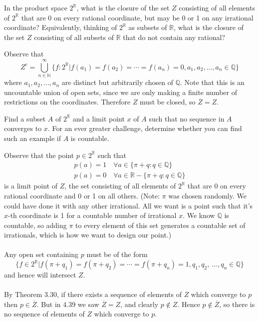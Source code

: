 \documentclass[a4paper,12pt,twoside]{hmcpset}
\begin{document}
\begin{exercise}[Exercise 4.39]
    In the product space $2^{\mathbb{R}}$, what is the closure of the set
$Z$ consisting of all elements of $2^\mathbb{R}$ that are 0 on
every rational coordinate, but may be 0 or 1 on any irrational
coordinate? Equivalently, thinking of $2^{\mathbb{R}}$ as subsets
of $\mathbb{R}$, what is the closure of the set $Z$ consisting of
all subsets of $\mathbb{R}$ that do not contain any rational? 
\end{exercise}

\begin{solution}
Observe that 
\[
    Z^c = \bigcup_{n \in \mathbb{N}}^{\infty} \{f : {2}^{\mathbb{R}} | f(a_1) = f(a_2) = \cdots = f(a_n) = 0, a_1, a_2, \dots, a_n \in \mathbb{Q}\}
\]
where $a_1, a_2, \dots, a_n$ are distinct but arbitrarily chosen of
$\mathbb{Q}$. Note that this is an uncountable union of open sets,
since we are only making a finite number of restrictions on the
coordinates. Therefore $Z$ must be closed, so $\overline{Z} = Z$.
\end{solution}

\begin{exercise}[Exercise 4.40]
    Find a subset $A$ of $2^\mathbb{R}$ and a limit
point $x$ of $A$ such that
no sequence in $A$ converges to $x$. For an ever greater challenge,
determine whether you can find such an example if $A$ is countable.
\end{exercise}

\begin{solution}
Observe that the point $p \in 2^{\mathbb{R}}$ such that 
\begin{gather*}
    p(a) = 1 \quad \forall a \in \{\pi + q : q \in \mathbb{Q}\}\\
    p(a) = 0 \quad \forall a \in \mathbb{R} - \{\pi + q : q \in \mathbb{Q}\}
\end{gather*} 
is a limit point of $Z$, the set consisting of
all elements of $2^\mathbb{R}$ that are 0 on every rational coordinate
and 0 or 1 on all others.
(Note: $\pi$ was chosen randomly. We could have done it with any other
irrational. All we want is a point such that it's $x$-th coordinate is
1 for a countable number of irrational $x$. We know $\mathbb{Q}$ is
countable, so adding $\pi$ to every element of this set generates a
countable set of irrationals, which is how we want to design our point.)
\\
\\
Any open set containing $p$ must be of the form 
\[
    \{
        f \in 2^\mathbb{R} | f(\pi + q_1) = f(\pi + q_2) = \cdots = f(\pi + q_n) = 1, q_1, q_2, \
        \dots, q_n \in \mathbb{Q}  
    \}
\]
and hence will intersect $Z$.
\\
\\
By Theorem 3.30, if there exists a sequence
of elements of $Z$ which converge to $p$ then $p \in \overline{Z}.$
But in 4.39 we saw $\overline{Z} = Z$, and clearly $p \not\in Z$.
Hence $p \not\in \overline{Z}$, so there is no sequence of elements of
$Z$ which converge to $p$. 
\end{solution}
\end{document}
